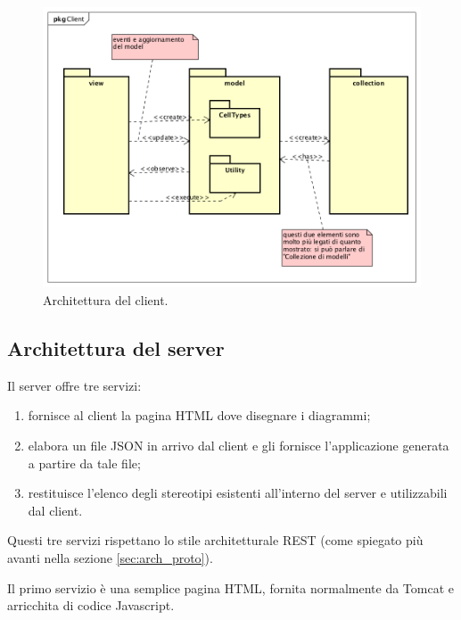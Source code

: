 \begin{figure} \label{fig:client_pkg}
	\includegraphics[scale=0.5]{img/client_pkg}
	\caption{Architettura del client.}
\end{figure}




\subsection{Architettura del server} \label{sec:arch_server}
Il server offre tre servizi:
\begin{enumerate}
	\item fornisce al client la pagina HTML dove disegnare i diagrammi;
	\item elabora un file JSON in arrivo dal client e gli fornisce l'applicazione generata a partire da tale file;
	\item restituisce l'elenco degli stereotipi esistenti all'interno del server e utilizzabili dal client.
\end{enumerate}
Questi tre servizi rispettano lo stile architetturale REST (come spiegato più avanti nella sezione \ref{sec:arch_proto}).

Il primo servizio è una semplice pagina HTML, fornita normalmente da Tomcat e arricchita di codice Javascript.


